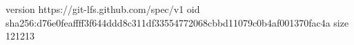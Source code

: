 version https://git-lfs.github.com/spec/v1
oid sha256:d76e0feaffff3f644ddd8c311df33554772068cbbd11079c0b4af001370fac4a
size 121213
